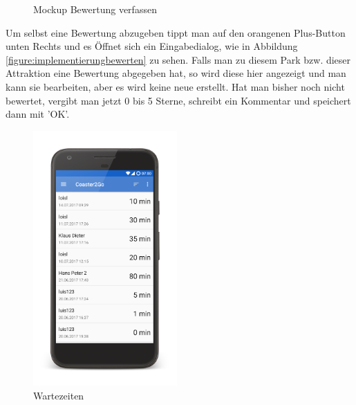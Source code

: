 \begin{figure}[h]
\begin{minipage}{0.49\textwidth}
        \caption{Mockup Bewertung verfassen}
    \end{minipage}
\end{figure}

Um selbst eine Bewertung abzugeben tippt man auf den orangenen Plus-Button unten Rechts und es Öffnet sich ein Eingabedialog, wie in Abbildung \ref{figure:implementierungbewerten} zu sehen. Falls man zu diesem Park bzw. dieser Attraktion eine Bewertung abgegeben hat, so wird diese hier angezeigt und man kann sie bearbeiten, aber es wird keine neue erstellt. Hat man bisher noch nicht bewertet, vergibt man jetzt 0 bis 5 Sterne, schreibt ein Kommentar und speichert dann mit 'OK'.

\begin{figure}[h]
    \centering
    \begin{minipage}{0.49\textwidth}
        \centering
        \includegraphics[width=0.49\textwidth, trim=150 200 200 200, 
        clip]{img/screenshots/ss_wartezeiten.png}
        \caption{Wartezeiten}
		\label{figure:implementierungwartezeiten}
    \end{minipage}
    \begin{minipage}{0.49\textwidth}
        \centering

\end{minipage}
\end{figure}
